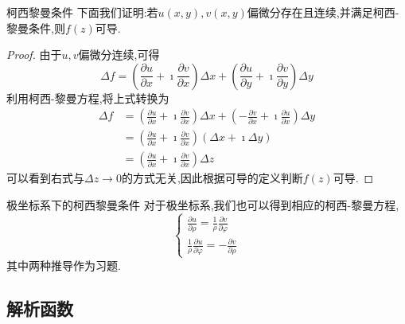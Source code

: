 \documentclass[fontset=windows, chinese, 10pt]{beamer}
\begin{document}
\begin{frame}{柯西黎曼条件}
  \small  下面我们证明:若$u(x,y), v(x,y)$偏微分存在且连续,并满足柯西-黎曼条件,则$f(z)$可导.
  \begin{proof}
      由于$u,v$偏微分连续,可得
      \[
          \Delta f=\left(\frac{\partial u}{\partial x}+\imath \frac{\partial v}{\partial x}\right) \Delta x+\left(\frac{\partial u}{\partial y}+ \imath \frac{\partial v}{\partial y}\right) \Delta y
      \]
      利用柯西-黎曼方程,将上式转换为
      \[
          \begin{aligned}
          \Delta f & =\left(\frac{\partial u}{\partial x}+ \imath \frac{\partial v}{\partial x}\right) \Delta x+\left(-\frac{\partial v}{\partial x}+ \imath\frac{\partial u}{\partial x}\right) \Delta y \\
          & =\left(\frac{\partial u}{\partial x}+ \imath \frac{\partial v}{\partial x}\right)(\Delta x+ \imath \Delta y) 
          \\
          & = \left(\frac{\partial u}{\partial x}+ \imath \frac{\partial v}{\partial x}\right) \Delta z
          \end{aligned}
      \]
  可以看到右式与$\Delta z\to 0$的方式无关,因此根据可导的定义判断$f(z)$可导.
\end{proof}

\end{frame}
\begin{frame}{极坐标系下的柯西黎曼条件}
  对于极坐标系,我们也可以得到相应的柯西-黎曼方程,
  \begin{equation}
      \left\{\begin{array}{l}
      \frac{\partial u}{\partial \rho}=\frac{1}{\rho} \frac{\partial v}{\partial \varphi} \\
      \frac{1}{\rho} \frac{\partial u}{\partial \varphi}=-\frac{\partial v}{\partial \rho}
      \end{array}\right.
      \end{equation}
  其中两种推导作为习题.
\end{frame}

\subsection{解析函数}
\end{document}
